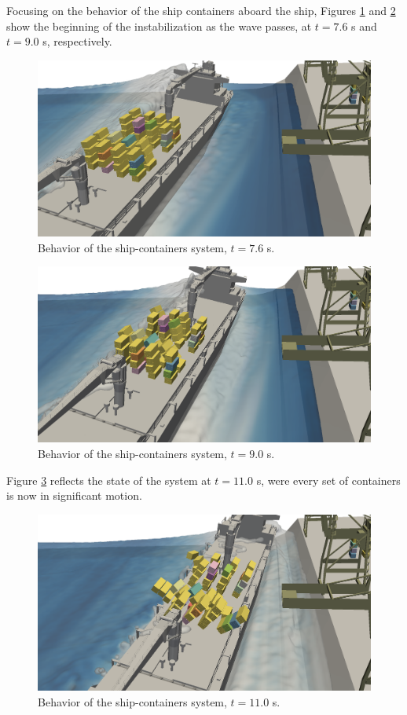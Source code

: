 Focusing on the behavior of the ship containers aboard the ship, Figures \ref{fig:ship_t38} and \ref{fig:ship_t45} show the beginning of the instabilization as the wave passes, at $t=7.6$ s and $t=9.0$ s, respectively.
%
\begin{figure}[H]
	\centering
	\includegraphics[width=0.95\linewidth]{Figures/6.Chapter/ship_t38} 
	\caption{Behavior of the ship-containers system, $t=7.6$ s.}
	\label{fig:ship_t38} 
\end{figure}
%
%
\begin{figure}[H]
	\centering
	\includegraphics[width=0.95\linewidth]{Figures/6.Chapter/ship_t45} 
	\caption{Behavior of the ship-containers system, $t=9.0$ s.}
	\label{fig:ship_t45} 
\end{figure}
%

Figure \ref{fig:ship_t55} reflects the state of the system at $t=11.0$ s, were every set of containers is now in significant motion.
%
\begin{figure}[H]
	\centering
	\includegraphics[width=0.95\linewidth]{Figures/6.Chapter/ship_t55} 
	\caption{Behavior of the ship-containers system, $t=11.0$ s.}
	\label{fig:ship_t55} 
\end{figure}
%

